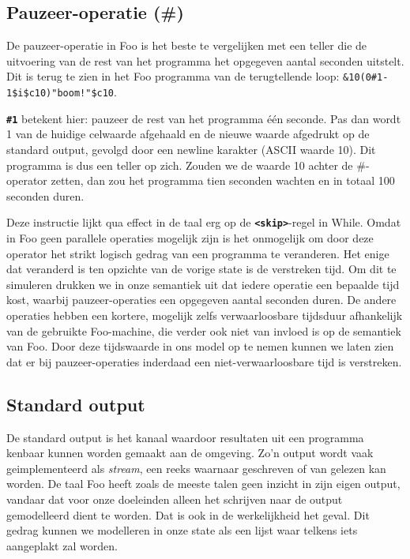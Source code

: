 \documentclass[11pt]{article}
\begin{document}
\subsection{Pauzeer-operatie (\#)}
De pauzeer-operatie in Foo is het beste te vergelijken met een teller die de uitvoering van de rest van het programma het opgegeven aantal seconden uitstelt. 
Dit is terug te zien in het Foo programma van de terugtellende loop: \verb|&10(0#1-1$i$c10)"boom!"$c10|.

{\bf \verb|#1|} betekent hier: pauzeer de rest van het programma \'e\'en seconde. 
Pas dan wordt 1 van de huidige celwaarde afgehaald en de nieuwe waarde afgedrukt op de standard output, gevolgd door een newline karakter (ASCII waarde 10).
Dit programma is dus een teller op zich.
Zouden we de waarde 10 achter de \#-operator zetten, dan zou het programma tien seconden wachten en in totaal 100 seconden duren.

Deze instructie lijkt qua effect in de taal erg op de {\bf\verb|<skip>|}-regel in While.
Omdat in Foo geen parallele operaties mogelijk zijn is het onmogelijk om door deze operator het strikt logisch gedrag van een programma te veranderen.
Het enige dat veranderd is ten opzichte van de vorige state is de verstreken tijd.
Om dit te simuleren drukken we in onze semantiek uit dat iedere operatie een bepaalde tijd kost, waarbij pauzeer-operaties een opgegeven aantal seconden duren.
De andere operaties hebben een kortere, mogelijk zelfs verwaarloosbare tijdsduur afhankelijk van de gebruikte Foo-machine, die verder ook niet van invloed is op de semantiek van Foo.
Door deze tijdswaarde in ons model op te nemen kunnen we laten zien dat er bij pauzeer-operaties inderdaad een niet-verwaarloosbare tijd is verstreken.

\subsection{Standard output}
De standard output is het kanaal waardoor resultaten uit een programma kenbaar kunnen worden gemaakt aan de omgeving.
Zo'n output wordt vaak geimplementeerd als \textit{stream}, een reeks waarnaar geschreven of van gelezen kan worden.
De taal Foo heeft zoals de meeste talen geen inzicht in zijn eigen output, vandaar dat voor onze doeleinden alleen het schrijven naar de output gemodelleerd dient te worden.
Dat is ook in de werkelijkheid het geval.
Dit gedrag kunnen we modelleren in onze state als een lijst waar telkens iets aangeplakt zal worden.
\end{document}
